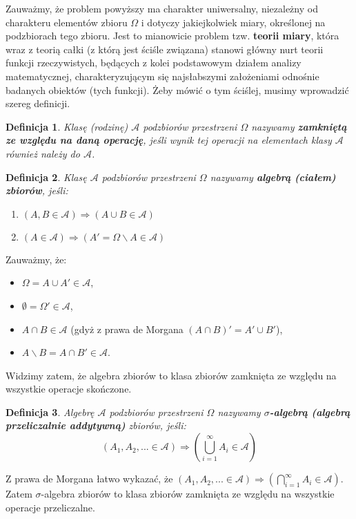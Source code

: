 \documentclass[10pt,a4paper]{article}
\newtheorem{defin}{Definicja}[section]
\begin{document}
Zauważmy, że problem powyższy ma charakter uniwersalny, niezależny od charakteru elementów zbioru $\Omega$ i dotyczy jakiejkolwiek miary, określonej na podzbiorach tego zbioru.
Jest to mianowicie problem tzw. \textbf{teorii miary}, która wraz z teorią całki (z którą jest ściśle związana) stanowi główny nurt teorii funkcji
rzeczywistych, będących z kolei podstawowym działem analizy matematycznej, charakteryzującym się najsłabszymi założeniami odnośnie badanych obiektów (tych funkcji).
Żeby mówić o tym ściślej, musimy wprowadzić szereg definicji.
\begin{defin}
Klasę (rodzinę) $\mathscr{A}$ podzbiorów przestrzeni $\Omega$ nazywamy \textbf{zamkniętą ze względu na daną operację}, jeśli wynik tej operacji na elementach klasy $\mathscr{A}$ również należy do $\mathscr{A}$.
\end{defin}
\begin{defin}
Klasę $\mathscr{A}$ podzbiorów przestrzeni $\Omega$ nazywamy \textbf{algebrą (ciałem) zbiorów}, jeśli:
\begin{enumerate}
\item[1$^\circ$] $(A, B \in\mathscr{A}) \Longrightarrow (A\cup B \in \mathscr{A})$
\item[2$^\circ$] $(A\in\mathscr{A})\Longrightarrow (A'=\Omega \backslash A \in \mathscr{A})$
\end{enumerate}
\end{defin}
Zauważmy, że:
\begin{itemize}
\item $\Omega=A\cup A' \in \mathscr{A}$,
\item $\emptyset=\Omega'\in\mathscr{A}$,
\item $A\cap B\in\mathscr{A}$ (gdyż z prawa de Morgana $(A\cap B)'=A'\cup B'$),
\item $A\backslash B=A\cap B' \in\mathscr{A}$.
\end{itemize}
Widzimy zatem, że algebra zbiorów to klasa zbiorów zamknięta ze względu na wszystkie operacje  skończone.
\begin{defin}
Algebrę $\mathscr{A}$ podzbiorów przestrzeni $\Omega$ nazywamy \textbf{$\sigma$-algebrą (algebrą przeliczalnie addytywną)} zbiorów, jeśli:
\begin{equation}
(A_1, A_2, ...\in \mathscr{A}) \Longrightarrow (\bigcup_{i=1}^{\infty}A_i\in\mathscr{A})
\end{equation}
\end{defin}
Z prawa de Morgana łatwo wykazać, że $(A_1, A_2, ...\in \mathscr{A}) \Longrightarrow (\bigcap_{i=1}^{\infty}A_i\in\mathscr{A})$.
Zatem $\sigma$-algebra zbiorów to klasa zbiorów zamknięta ze względu na wszystkie operacje przeliczalne.
\end{document}
